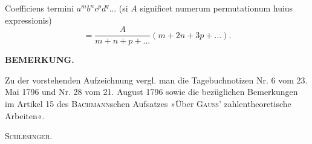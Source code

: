 Coefficiens termini $a^mb^nc^pd^q\ldots$ (si $A$ significet numerum permutationum
huius expressionis)
\[=\frac A{m+n+p+\ldots}(m+2n+3p+\ldots).\]
\begin{center}\textbf{BEMERKUNG.}\end{center}
\begingroup\small
\noindent\hspace*{\parindent}Zu der vorstehenden Aufzeichnung vergl. man die Tagebuchnotizen
Nr. 6 vom 23. Mai 1796 und Nr. 28 vom 21. August 1796 sowie die bezüglichen Bemerkungen
im Artikel 15 des \textsc{Bachmann}schen Aufsatzes »Über \textsc{Gauss}’ zahlentheoretische Arbeiten«.
\par\noindent\hfill\textsc{Schlesinger}.\par
\endgroup
\ClosingRule
\clearpage
